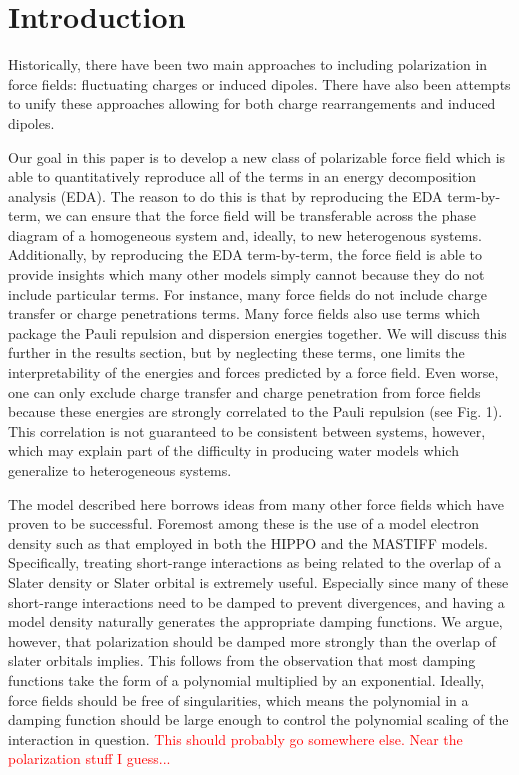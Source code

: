 \documentclass[journal=jacsat,manuscript=article]{achemso}
\begin{document}
\section{Introduction}
Historically, there have been two main approaches to including
polarization in force fields: fluctuating charges\cite{rick1994dynamical}
or induced dipoles\cite{applequist1985multipole}. There have also been
attempts to unify these approaches allowing for both charge rearrangements
and induced dipoles.\cite{stern2001combined}

Our goal in this paper is to develop a new class of polarizable
force field which is able to quantitatively reproduce all of the terms
in an energy decomposition analysis (EDA)\cite{horn2016probing,mao2021intermolecular}. The reason to do this
is that by reproducing the EDA term-by-term, we can ensure that the force
field will be transferable across the phase diagram of a homogeneous
system and, ideally, to new heterogenous systems.
Additionally, by reproducing the EDA term-by-term, the force field
is able to provide insights which many other models simply cannot because
they do not include particular terms. For instance, many force fields
do not include charge transfer or charge penetrations terms.
Many force fields also use terms which package the Pauli repulsion and dispersion 
energies together. We will discuss this further in the results section,
but by neglecting these terms, one limits the interpretability of the
energies and forces predicted by a force field. Even worse, one can only
exclude charge transfer and charge penetration from force fields because
these energies are strongly correlated to the Pauli repulsion (see Fig. 1).
This correlation is not guaranteed to be consistent between systems, however,
which may explain part of the difficulty in producing water models which
generalize to heterogeneous systems.

The model described here borrows ideas from many other force fields which
have proven to be successful. Foremost among these is the use of a model
electron density such as that employed in both the HIPPO\cite{rackers2021polarizable}
and the MASTIFF models\cite{van2016beyond,van2018new}. Specifically, treating
short-range interactions as being related to the overlap of a Slater density
or Slater orbital is extremely useful. Especially since many of these short-range
interactions need to be damped to prevent divergences, and having a model density
naturally generates the appropriate damping functions. We argue, however, that
polarization should be damped more strongly than the overlap of slater orbitals
implies. This follows from the observation that most damping functions take the form
of a polynomial multiplied by an exponential. Ideally, force fields should be free
of singularities, which means the polynomial in a damping function should be large
enough to control the polynomial scaling of the interaction in question.
\textcolor{red}{This should probably go somewhere else. Near the polarization stuff I guess...}
\end{document}

